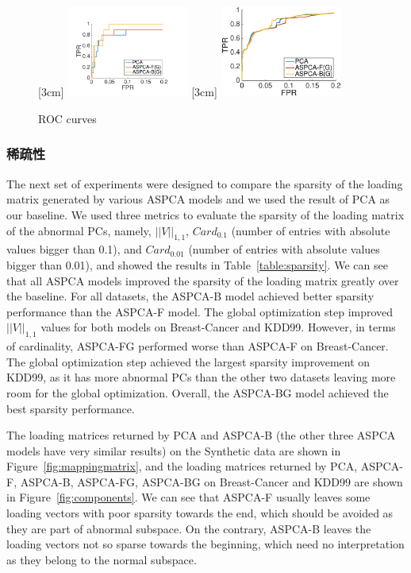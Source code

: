 \begin{figure}
\centering
  [3cm] 
  {\includegraphics[width=40mm]{figure/new/Cancer-AUC-5}}
    [3cm] 
  {\includegraphics[width=40mm]{figure/new/KDD-AUC-100}}
\caption{ROC curves}
\label{fig:detection performane}
\end{figure}

\subsubsection{稀疏性}
The next set of experiments were designed to compare the sparsity of the loading matrix generated by various ASPCA models and we used the result of PCA as our baseline.  We used three metrics to evaluate the sparsity of the loading matrix of the abnormal PCs, namely,  $||V||_{1,1}$, $Card_{0.1}$ (number of entries with absolute values bigger than 0.1), and $Card_{0.01}$ (number of entries with absolute values bigger than 0.01), and showed the results in Table~\ref{table:sparsity}. We can see that all ASPCA models improved the sparsity of the loading matrix greatly over the baseline. For all datasets, the ASPCA-B model achieved better sparsity performance than the ASPCA-F model. The global optimization step improved $||V||_{1,1}$ values for both models on Breast-Cancer and KDD99. However, in terms of cardinality, ASPCA-FG performed worse than ASPCA-F on Breast-Cancer. The global optimization step achieved the largest sparsity improvement on KDD99, as it has more abnormal PCs than the other two datasets leaving more room for the global optimization. Overall, the ASPCA-BG model achieved the best sparsity performance.

The loading matrices returned by PCA and ASPCA-B (the other three ASPCA models have very similar results) on the Synthetic data are shown in Figure~\ref{fig:mappingmatrix}, and the loading matrices returned by PCA, ASPCA-F, ASPCA-B, ASPCA-FG, ASPCA-BG on Breast-Cancer and KDD99 are shown in Figure~\ref{fig:components}. We can see that ASPCA-F usually leaves some loading vectors with poor sparsity towards the end, which should be avoided as they are part of abnormal subspace. On the contrary, ASPCA-B leaves the loading vectors not so sparse towards the beginning, which need no interpretation as they belong to the normal subspace.

